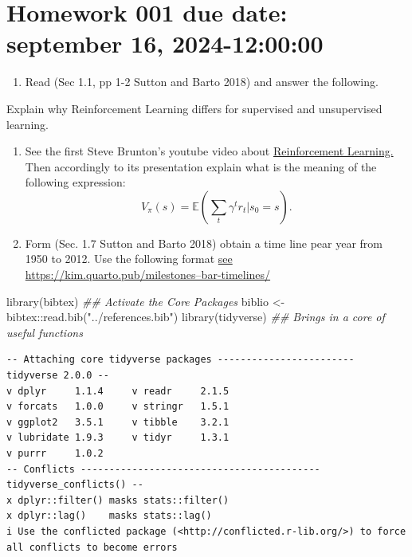 \documentclass[
  letterpaper,
  DIV=11,
  numbers=noendperiod]{scrreprt}
\newenvironment{Shaded}{\begin{snugshade}}{\end{snugshade}}
\newcommand{\DocumentationTok}[1]{\textcolor[rgb]{0.37,0.37,0.37}{\textit{#1}}}
\newcommand{\FunctionTok}[1]{\textcolor[rgb]{0.28,0.35,0.67}{#1}}
\newcommand{\NormalTok}[1]{\textcolor[rgb]{0.00,0.23,0.31}{#1}}
\newcommand{\OtherTok}[1]{\textcolor[rgb]{0.00,0.23,0.31}{#1}}
\newcommand{\SpecialCharTok}[1]{\textcolor[rgb]{0.37,0.37,0.37}{#1}}
\newcommand{\StringTok}[1]{\textcolor[rgb]{0.13,0.47,0.30}{#1}}
\providecommand{\tightlist}{%
  \setlength{\itemsep}{0pt}\setlength{\parskip}{0pt}}\usepackage{longtable,booktabs,array}
\theoremstyle{definition}
\theoremstyle{remark}
\begin{document}

\section*{Homework 001 due date: september 16,
2024-12:00:00}\label{homework-001-due-date-september-16-2024-120000}


\begin{enumerate}
\def\labelenumi{\arabic{enumi}.}
\tightlist
\item
  Read (Sec 1.1, pp 1-2 Sutton and Barto 2018) and answer the following.
\end{enumerate}

Explain why Reinforcement Learning differs for supervised and
unsupervised learning.

\begin{enumerate}
\def\labelenumi{\arabic{enumi}.}
\setcounter{enumi}{1}
\item
  See the first Steve Brunton's youtube video about
  \href{https://www.youtube.com/watch?v=0MNVhXEX9to&list=PLMrJAkhIeNNQe1JXNvaFvURxGY4gE9k74}{Reinforcement
  Learning.} Then accordingly to its presentation explain what is the
  meaning of the following expression: \[
    V_{\pi}(s) = \mathbb{E}
   \left(
     \sum_{t} \gamma ^ {t} r_t | s_0 = s
   \right).
  \]
\item
  Form (Sec. 1.7 Sutton and Barto 2018) obtain a time line pear year
  from 1950 to 2012. Use the following format
  \href{https://kim.quarto.pub/milestones--bar-timelines/}{see
  https://kim.quarto.pub/milestones--bar-timelines/}
\end{enumerate}

\begin{Shaded}
\begin{Highlighting}[]
\FunctionTok{library}\NormalTok{(bibtex)}
\DocumentationTok{\#\# Activate the Core Packages}
\NormalTok{biblio }\OtherTok{\textless{}{-}}\NormalTok{ bibtex}\SpecialCharTok{::}\FunctionTok{read.bib}\NormalTok{(}\StringTok{"../references.bib"}\NormalTok{)}
\FunctionTok{library}\NormalTok{(tidyverse) }\DocumentationTok{\#\# Brings in a core of useful functions}
\end{Highlighting}
\end{Shaded}

\begin{verbatim}
-- Attaching core tidyverse packages ------------------------ tidyverse 2.0.0 --
v dplyr     1.1.4     v readr     2.1.5
v forcats   1.0.0     v stringr   1.5.1
v ggplot2   3.5.1     v tibble    3.2.1
v lubridate 1.9.3     v tidyr     1.3.1
v purrr     1.0.2     
-- Conflicts ------------------------------------------ tidyverse_conflicts() --
x dplyr::filter() masks stats::filter()
x dplyr::lag()    masks stats::lag()
i Use the conflicted package (<http://conflicted.r-lib.org/>) to force all conflicts to become errors
\end{verbatim}
\end{document}
